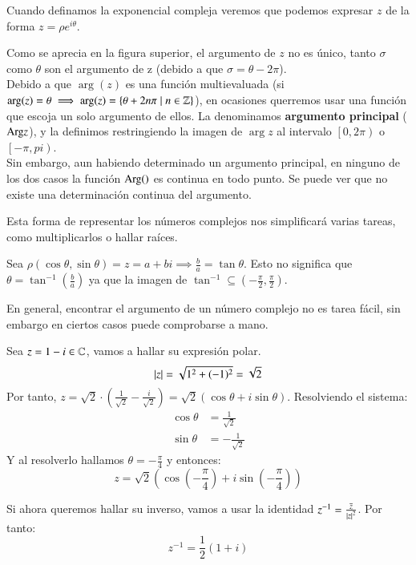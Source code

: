     Cuando definamos la exponencial compleja veremos que podemos expresar $z$ de la forma $z = \rho e^{i\theta}$.

    \begin{obs} %
        Como se aprecia en la figura superior, el argumento de $z$ no es único, tanto $\sigma$ como $\theta$ son el argumento de z (debido a que $\sigma = \theta - 2\pi$).\\

        Debido a que $\arg(z)$ es una función multievaluada (si $\arg(z) = \theta \implies \arg(z) = \left\{\theta + 2n \pi \mid n \in \mathbb{Z}\right\}$), en ocasiones querremos usar una función que escoja un solo argumento de ellos. La denominamos \textbf{argumento principal} ($\mathrm{Arg}{z}$), y la definimos restringiendo la imagen de $\arg{z}$ al intervalo $\left[0, 2\pi\right)$ o $\left[-\pi, pi\right)$.\\

        Sin embargo, aun habiendo determinado un argumento principal, en ninguno de los dos casos la función $\mathrm{Arg}()$ es continua en todo punto. Se puede ver que no existe una determinación continua del argumento.
    \end{obs}

    Esta forma de representar los números complejos nos simplificará varias tareas, como multiplicarlos o hallar raíces.

    \begin{obs}
        Sea $\rho(\cos \theta, \sin \theta) = z = a + bi \implies \frac{b}{a} = \tan{\theta}$. Esto no significa que $\theta = \tan^{-1}\left(\frac{b}{a}\right)$ ya que la imagen de $\tan^{-1} \subseteq \left(-\frac{\pi}{2}, \frac{\pi}{2}\right)$.
    \end{obs}

    En general, encontrar el argumento de un número complejo no es tarea fácil, sin embargo en ciertos casos puede comprobarse a mano.

    \begin{eg}
        Sea $z = 1-i \in \mathbb{C}$, vamos a hallar su expresión polar.
        $$
            \left|z\right| = \sqrt{1^2 + (-1)^2} = \sqrt 2
        $$
        Por tanto, $z = \sqrt{2} \cdot \left( \frac{1}{\sqrt 2} - \frac{i}{\sqrt 2} \right) = \sqrt 2 (\cos \theta + i \sin \theta)$. Resolviendo el sistema:
        \begin{align*}
            \cos \theta &= \frac{1}{\sqrt 2}\\
            \sin \theta &= - \frac{1}{\sqrt 2}
        \end{align*}
        Y al resolverlo hallamos $\theta = -\frac{\pi}{4}$ y entonces:
        $$
            z = \sqrt{2} (\cos \left(-\frac{\pi}{4}\right) + i \sin \left(-\frac{\pi}{4}\right))
        $$

        Si ahora queremos hallar su inverso, vamos a usar la identidad $z^{-1} = \frac{\overline{z}}{\left|z\right|^2}$. Por tanto:
        $$
            z^{-1} = \frac{1}{2} (1 + i)
        $$
    \end{eg}

